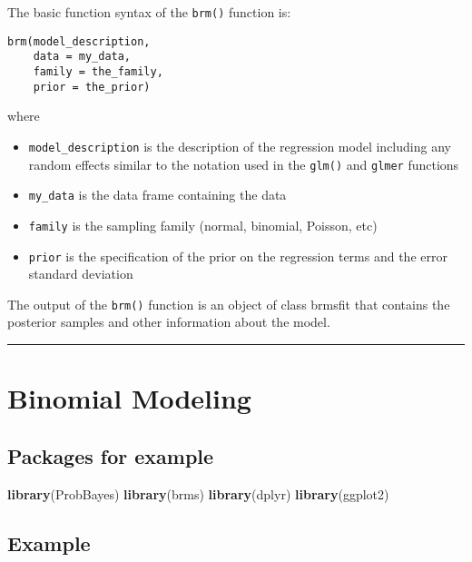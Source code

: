\documentclass[
]{book}
\newenvironment{Shaded}{\begin{snugshade}}{\end{snugshade}}
\newcommand{\KeywordTok}[1]{\textcolor[rgb]{0.13,0.29,0.53}{\textbf{#1}}}
\newcommand{\NormalTok}[1]{#1}
\providecommand{\tightlist}{%
  \setlength{\itemsep}{0pt}\setlength{\parskip}{0pt}}
\begin{document}
The basic function syntax of the \texttt{brm()} function is:

\begin{verbatim}
brm(model_description, 
    data = my_data, 
    family = the_family,
    prior = the_prior)
\end{verbatim}

where

\begin{itemize}
\tightlist
\item
  \texttt{model\_description} is the description of the regression model including any random effects similar to the notation used in the \texttt{glm()} and \texttt{glmer} functions
\item
  \texttt{my\_data} is the data frame containing the data
\item
  \texttt{family} is the sampling family (normal, binomial, Poisson, etc)
\item
  \texttt{prior} is the specification of the prior on the regression terms and the error standard deviation
\end{itemize}

The output of the \texttt{brm()} function is an object of class brmsfit that contains the posterior samples and other information about the model.

\begin{center}\rule{0.5\linewidth}{0.5pt}\end{center}

\hypertarget{binomial-modeling}{%
\chapter{Binomial Modeling}\label{binomial-modeling}}

\hypertarget{packages-for-example}{%
\section{Packages for example}\label{packages-for-example}}

\begin{Shaded}
\begin{Highlighting}[]
\KeywordTok{library}\NormalTok{(ProbBayes)}
\KeywordTok{library}\NormalTok{(brms)}
\KeywordTok{library}\NormalTok{(dplyr)}
\KeywordTok{library}\NormalTok{(ggplot2)}
\end{Highlighting}
\end{Shaded}

\hypertarget{example}{%
\section{Example}\label{example}}
\end{document}
